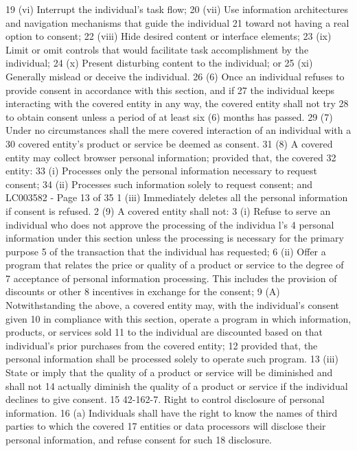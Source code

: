 19 (vi) Interrupt the individual's task flow;
20 (vii) Use information architectures and navigation mechanisms that guide the individual
21 toward not having a real option to consent;
22 (viii) Hide desired content or interface elements;
23 (ix) Limit or omit controls that would facilitate task accomplishment by the individual;
24 (x) Present disturbing content to the individual; or
25 (xi) Generally mislead or deceive the individual.
26 (6) Once an individual refuses to provide consent in accordance with this section, and if
27 the individual keeps interacting with the covered entity in any way, the covered entity shall not try
28 to obtain consent unless a period of at least six (6) months has passed.
29 (7) Under no circumstances shall the mere covered interaction of an individual with a
30 covered entity's product or service be deemed as consent.
31 (8) A covered entity may collect browser personal information; provided that, the covered
32 entity:
33 (i) Processes only the personal information necessary to request consent;
34 (ii) Processes such information solely to request consent; and
LC003582 - Page 13 of 35
1 (iii) Immediately deletes all the personal information if consent is refused.
2 (9) A covered entity shall not:
3 (i) Refuse to serve an individual who does not approve the processing of the individua l's
4 personal information under this section unless the processing is necessary for the primary purpose
5 of the transaction that the individual has requested;
6 (ii) Offer a program that relates the price or quality of a product or service to the degree of
7 acceptance of personal information processing. This includes the provision of discounts or other
8 incentives in exchange for the consent;
9 (A) Notwithstanding the above, a covered entity may, with the individual's consent given
10 in compliance with this section, operate a program in which information, products, or services sold
11 to the individual are discounted based on that individual's prior purchases from the covered entity;
12 provided that, the personal information shall be processed solely to operate such program.
13 (iii) State or imply that the quality of a product or service will be diminished and shall not
14 actually diminish the quality of a product or service if the individual declines to give consent.
15 42-162-7. Right to control disclosure of personal information.
16 (a) Individuals shall have the right to know the names of third parties to which the covered
17 entities or data processors will disclose their personal information, and refuse consent for such
18 disclosure.
